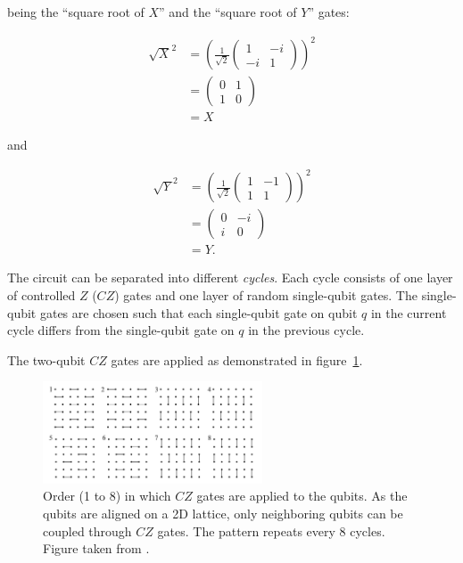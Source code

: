 being the ``square root of $X$'' and the ``square root of $Y$'' gates:

\begin{align}
  \sqrt{X}^2 &= \left(\frac{1}{\sqrt{2}} \begin{pmatrix}
    1 & - i \\
    - i & 1
  \end{pmatrix}\right)^2 \\
  &= \begin{pmatrix}
    0 & 1 \\
    1 & 0
  \end{pmatrix} \\
  &= X
\end{align}

and

\begin{align}
  \sqrt{Y}^2 &= \left(\frac{1}{\sqrt{2}} \begin{pmatrix}
    1 & -1 \\
    1 & 1
  \end{pmatrix}\right)^2 \\
  &= \begin{pmatrix}
    0 & -i \\
    i & 0
  \end{pmatrix} \\
  &= Y.
\end{align}

The circuit can be separated into different \textit{cycles}. Each cycle consists of one
layer of controlled $Z$ ($CZ$) gates and one layer of random single-qubit gates. The single-qubit
gates are chosen such that each single-qubit gate on qubit $q$ in the current
cycle differs from the single-qubit gate on $q$ in the previous cycle.

The two-qubit $CZ$ gates are applied as demonstrated in figure~\ref{fig:czgates}.

\begin{figure}[H]
  \centering
  \includegraphics[width=0.58\textwidth]{figures/cz_order}
  \caption[Order of $CZ$ Gate Applications in Random Circuits]{Order (1 to 8) in which $CZ$ gates are applied to the qubits. As 
  the qubits are aligned on a 2D lattice, only neighboring qubits can be coupled through $CZ$ gates. 
  The pattern repeats every 8 cycles. Figure taken from \cite{Boixo2018supremacy}.}
  \label{fig:czgates}
\end{figure}

